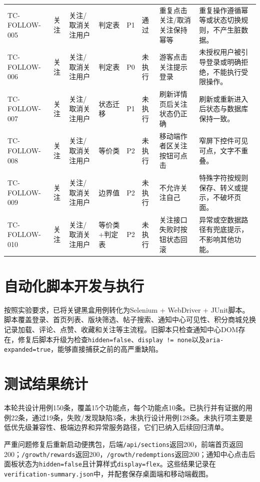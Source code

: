\documentclass[UTF8,zihao=-4]{ctexart}
\begin{document}
{\begin{longtable}{P{1.8cm}P{1.7cm}P{2.2cm}P{1.8cm}P{1cm}P{1.2cm}P{4.1cm}P{5.3cm}}
TC-FOLLOW-005 & 关注 & 关注/取消关注用户 & 判定表 & P1 & 通过 & 重复点击关注/取消关注保持幂等 & 重复操作遵循幂等或状态切换规则，不产生脏数据。 \\
TC-FOLLOW-006 & 关注 & 关注/取消关注用户 & 判定表 & P0 & 未执行 & 游客点击关注提示登录 & 未授权用户被引导登录或明确拒绝，不能执行受限操作。 \\
TC-FOLLOW-007 & 关注 & 关注/取消关注用户 & 状态迁移 & P1 & 未执行 & 刷新详情页后关注状态仍正确 & 刷新或重新进入后状态与数据库保持一致。 \\
TC-FOLLOW-008 & 关注 & 关注/取消关注用户 & 等价类 & P2 & 未执行 & 移动端作者区关注按钮可点击 & 窄屏下控件可见可点，文字不重叠。 \\
TC-FOLLOW-009 & 关注 & 关注/取消关注用户 & 边界值 & P2 & 未执行 & 不允许关注自己 & 特殊字符按规则保存、转义或提示，不破坏页面。 \\
TC-FOLLOW-010 & 关注 & 关注/取消关注用户 & 等价类+判定表 & P2 & 未执行 & 关注接口失败时按钮状态回滚 & 异常或空数据路径有兜底提示，不影响其他功能。 \\
\bottomrule
\end{longtable}
}

\section{自动化脚本开发与执行}
按照实验要求，已将关键黑盒用例转化为Selenium + WebDriver + JUnit脚本。脚本覆盖登录、首页列表、版块筛选、帖子搜索、通知中心可见性、积分商城兑换记录加载、评论、点赞、收藏和关注等主流程。旧脚本只检查通知中心DOM存在，修复后脚本升级为检查\texttt{hidden=false}、\texttt{display != none}以及\texttt{aria-expanded=true}，能够直接捕获之前的高严重缺陷。



\section{测试结果统计}
本轮共设计用例150条，覆盖15个功能点，每个功能点10条。已执行并有证据的用例22条，通过19条，失败/发现缺陷3条，未执行设计用例128条。未执行项主要是低优先级兼容性、极端边界和异常服务路径，它们已纳入后续回归清单。

严重问题修复后重新启动便携包，后端\texttt{/api/sections}返回200，前端首页返回200；\texttt{/growth/rewards}返回200，\texttt{/growth/redemptions}返回200；通知中心点击后面板状态为\texttt{hidden=false}且计算样式\texttt{display=flex}。这些结果记录在\texttt{verification-summary.json}中，并配套保存桌面端和移动端截图。
\end{document}
